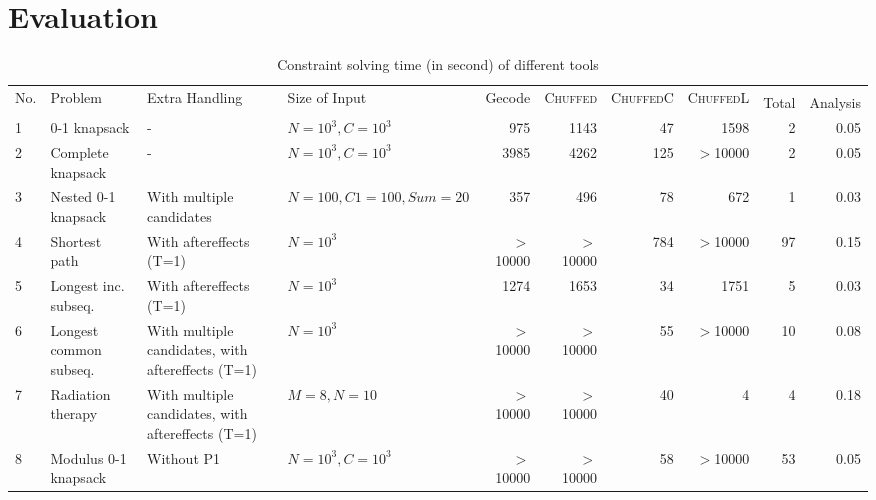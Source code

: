 \section{Evaluation}

    \begin{table*}[htb]\centering
    \caption{Constraint solving time (in second) of different tools 
    }\label{timecost}
    \scriptsize
		\begin{tabular}{l|l|p{2.8cm}|p{2.2cm}| r| r| r| r| r|r}\toprule
			\multirow{2}{*}{No.}&  \multirow{2}{*}{Problem}	&
			\multirow{2}{*}{Extra Handling} &\multirow{2}{*}{Size of Input}	&	\multirow{2}{*}{Gecode}	&   \multirow{2}{*}{\textsc{Chuffed}}    & 
			\multirow{2}{*}{\textsc{ChuffedC}}
			& \multirow{2}{*}{\textsc{ChuffedL}} &	\multicolumn{2}{c}{\tool}	\\	%
			& & & & & & & &Total & Analysis\\
			\midrule
			1 & 0-1 knapsack &-	&$N=10^3, C=10^3$	&	975	& 1143  &  47&  1598  &	2	&	0.05	\\ 
			
			2 & Complete knapsack &	- & $N = 10^3, C = 10^3$ &	3985	&  4262    & 125	&$>$10000 &2 & 0.05	\\
			
			3 & Nested 0-1 knapsack & With multiple candidates &$N=100, C1=100, Sum=20$ &357 & 496& 78 &672 & 1 & 0.03\\ 
			
			4 & Shortest path & With aftereffects (T=1) & $N=10^3$ & $>$10000 & $>$10000 & 784& $>$10000 & 97& 0.15\\
			5 & Longest inc. subseq. & With aftereffects (T=1)	& $N = 10^3$ &1274	& 1653  &	34 & 1751 &	5 & 0.03	\\

			6 & Longest common subseq. & With multiple candidates, with aftereffects (T=1) &  $N=10^3$ & $>$10000 & $>$10000  & 55& $>$10000 & 10& 0.08\\
           
           7 & Radiation therapy & With multiple candidates, with aftereffects (T=1)
&$M=8, N=10$& $>$10000& $>$10000& 40 &4 &4 & 0.18\\ 
			
			8 & Modulus 0-1 knapsack & Without P1 & $N=10^3, C=10^3$ & $>$10000 & $>$10000 & 58& $>$10000 & 53 & 0.05\\


			

\end{tabular}
\end{table*}
